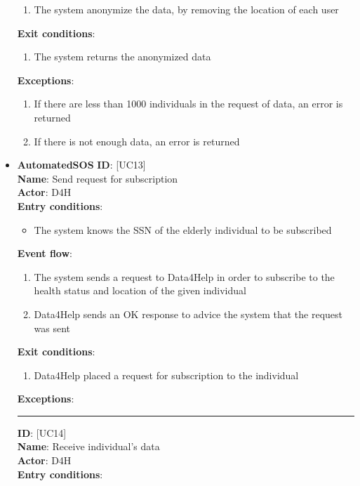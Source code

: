 \documentclass[12pt]{report}
\newcommand\usecase[1]{ [UC#1] }
\begin{document}
\begin{itemize}
\begin{enumerate}
    			\item{The system anonymize the data, by removing the location of each user}
  		\end{enumerate}
  	\textbf{Exit conditions}:
  		\begin{enumerate}
    			\item{The system returns the anonymized data}
  		\end{enumerate}
  	\textbf{Exceptions}: 
  		\begin{enumerate}
    			\item{If there are less than 1000 individuals in the request of data, an error is returned}
    			\item{If there is not enough data, an error is returned}
  		\end{enumerate}
  	\item{\textbf{AutomatedSOS}}
  	\textbf{ID}: \usecase{13} \\
  	\textbf{Name}: Send request for subscription \\
    \textbf{Actor}: D4H \\
    \textbf{Entry conditions}: 
    		\begin{itemize}
    			\item{The system knows the SSN of the elderly individual to be subscribed}
    		\end{itemize}
  	\textbf{Event flow}:
  		\begin{enumerate}
    			\item{The system sends a request to Data4Help in order to subscribe to the health status and location of the given individual}
    			\item{Data4Help sends an OK response to advice the system that the request was sent}
  		\end{enumerate}
  	\textbf{Exit conditions}:
  		\begin{enumerate}
    			\item{Data4Help placed a request for subscription to the individual}
  		\end{enumerate}
  	\textbf{Exceptions}: \\
  	\rule{\linewidth}{0.4pt}
  	\textbf{ID}: \usecase{14} \\
  	\textbf{Name}: Receive individual's data \\
    \textbf{Actor}: D4H \\
    \textbf{Entry conditions}: 
    		\begin{itemize}

\end{itemize}
\end{itemize}
\end{document}
